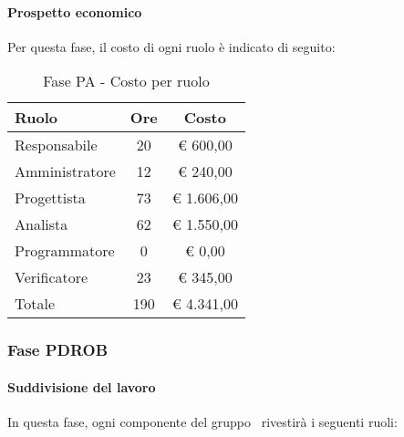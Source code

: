 \documentclass[../PianoProgetto.tex]{subfiles}
\begin{document}
	\paragraph{Prospetto economico}
					Per questa fase, il costo di ogni ruolo è indicato di seguito:
					\begin{table}[h]
		\centering
	
		\begin{tabular}{l * {2}{c}}
			\toprule
			Ruolo & Ore & Costo \\
			\midrule
			Responsabile &	20 & \euro{} 600,00 \\
			\midrule
			Amministratore & 12 & \euro{} 240,00 \\
			\midrule
			Progettista & 73 & \euro{} 1.606,00 \\
			\midrule
			Analista & 62 & \euro{} 1.550,00 \\
			\midrule
			Programmatore & 0 & \euro{} 0,00 \\
			\midrule
			Verificatore & 23 & \euro{} 345,00 \\
			\midrule		
			Totale & 190 & \euro{} 4.341,00 \\
			\bottomrule
			
		\end{tabular}
		
		\caption{Fase PA - Costo per ruolo}
		\label{tab:fasePA_costo}
		
	\end{table}
	
	\subsubsection{Fase PDROB}
				\paragraph{Suddivisione del lavoro}
					In questa fase, ogni componente del gruppo \leaf\ rivestirà i seguenti ruoli:
	
\end{document}
